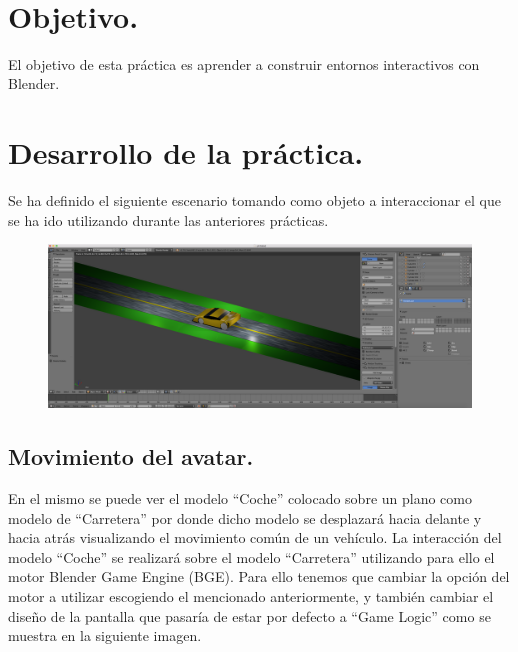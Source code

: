 \documentclass[10pt]{article}
\begin{document}
\begin{center}
 		\\																		%
\vspace{2cm} 																				
\begin{center}																					

 			\end{center}												  						
\end{center}							 											
																					
\newpage																		

\tableofcontents 

\newpage

\section{Objetivo.}
El objetivo de esta práctica es aprender a construir entornos interactivos con Blender.


\section{Desarrollo de la práctica.}
Se ha definido el siguiente escenario tomando como objeto a interaccionar el que se ha ido utilizando durante las anteriores prácticas. \\

\begin{figure}[H]
	\begin{center}
	 		\includegraphics[width = 1.00\textwidth]{Imagenes/p4-img1}
	\end{center} 
\end{figure}


\subsection{Movimiento del avatar.}
En el mismo se puede ver el modelo ``Coche'' colocado sobre un plano como modelo de ``Carretera'' por donde dicho modelo se desplazará hacia delante y hacia atrás visualizando el movimiento común de un vehículo. La interacción del modelo ``Coche'' se realizará sobre el modelo ``Carretera'' utilizando para ello el motor Blender Game Engine (BGE).  Para ello tenemos que cambiar la opción del motor a utilizar escogiendo el mencionado anteriormente, y también cambiar el diseño de la pantalla que pasaría de estar por defecto a ``Game Logic'' como se muestra en la siguiente imagen. \\
\end{document}
